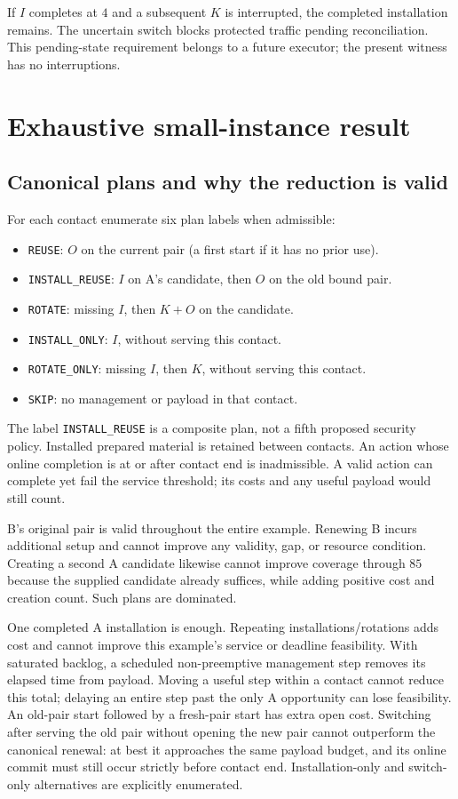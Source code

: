 \documentclass[11pt,a4paper]{article}
\newcommand{\act}[1]{\texttt{#1}}
\begin{document}
If $I$ completes at $4$ and a subsequent $K$ is interrupted, the completed installation remains. The uncertain switch blocks protected traffic pending reconciliation. This pending-state requirement belongs to a future executor; the present witness has no interruptions.

\section{Exhaustive small-instance result}
\subsection{Canonical plans and why the reduction is valid}
For each contact enumerate six plan labels when admissible:
\begin{itemize}
\item \act{REUSE}: $O$ on the current pair (a first start if it has no prior use).
\item \act{INSTALL\_REUSE}: $I$ on A's candidate, then $O$ on the old bound pair.
\item \act{ROTATE}: missing $I$, then $K+O$ on the candidate.
\item \act{INSTALL\_ONLY}: $I$, without serving this contact.
\item \act{ROTATE\_ONLY}: missing $I$, then $K$, without serving this contact.
\item \act{SKIP}: no management or payload in that contact.
\end{itemize}
The label \act{INSTALL\_REUSE} is a composite plan, not a fifth proposed security policy. Installed prepared material is retained between contacts. An action whose online completion is at or after contact end is inadmissible. A valid action can complete yet fail the service threshold; its costs and any useful payload would still count.

B's original pair is valid throughout the entire example. Renewing B incurs additional setup and cannot improve any validity, gap, or resource condition. Creating a second A candidate likewise cannot improve coverage through $85$ because the supplied candidate already suffices, while adding positive cost and creation count. Such plans are dominated.

One completed A installation is enough. Repeating installations/rotations adds cost and cannot improve this example's service or deadline feasibility. With saturated backlog, a scheduled non-preemptive management step removes its elapsed time from payload. Moving a useful step within a contact cannot reduce this total; delaying an entire step past the only A opportunity can lose feasibility. An old-pair start followed by a fresh-pair start has extra open cost. Switching after serving the old pair without opening the new pair cannot outperform the canonical renewal: at best it approaches the same payload budget, and its online commit must still occur strictly before contact end. Installation-only and switch-only alternatives are explicitly enumerated.
\end{document}
